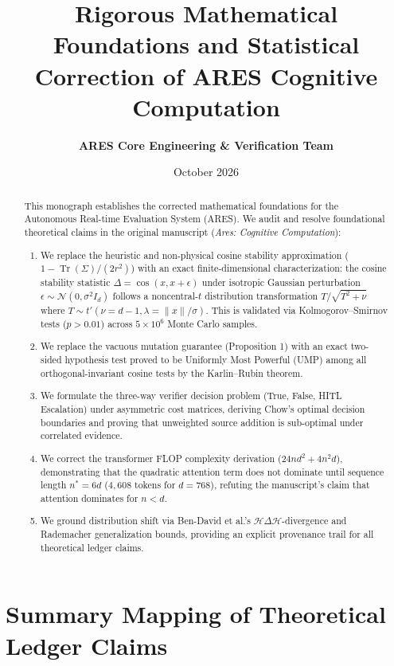 \documentclass[11pt,a4paper]{article}
\title{\textbf{Rigorous Mathematical Foundations and Statistical Correction of ARES Cognitive Computation}}
\author{\textbf{ARES Core Engineering \& Verification Team}}
\date{October 2026}
\theoremstyle{definition}
\begin{document}
\maketitle

\begin{abstract}
This monograph establishes the corrected mathematical foundations for the Autonomous Real-time Evaluation System (ARES). We audit and resolve foundational theoretical claims in the original manuscript (\textit{Ares: Cognitive Computation}):
\begin{enumerate}
    \item We replace the heuristic and non-physical cosine stability approximation ($1 - \operatorname{Tr}(\Sigma)/(2r^2)$) with an exact finite-dimensional characterization: the cosine stability statistic $\Delta = \cos(x, x+\epsilon)$ under isotropic Gaussian perturbation $\epsilon \sim \mathcal{N}(0, \sigma^2 I_d)$ follows a noncentral-$t$ distribution transformation $T / \sqrt{T^2 + \nu}$ where $T \sim t'(\nu = d-1, \lambda = \|x\|/\sigma)$. This is validated via Kolmogorov--Smirnov tests ($p > 0.01$) across $5 \times 10^6$ Monte Carlo samples.
    \item We replace the vacuous mutation guarantee (Proposition 1) with an exact two-sided hypothesis test proved to be Uniformly Most Powerful (UMP) among all orthogonal-invariant cosine tests by the Karlin--Rubin theorem.
    \item We formulate the three-way verifier decision problem (True, False, HITL Escalation) under asymmetric cost matrices, deriving Chow's optimal decision boundaries and proving that unweighted source addition is sub-optimal under correlated evidence.
    \item We correct the transformer FLOP complexity derivation ($24nd^2 + 4n^2d$), demonstrating that the quadratic attention term does not dominate until sequence length $n^* = 6d$ ($4{,}608$ tokens for $d=768$), refuting the manuscript's claim that attention dominates for $n < d$.
    \item We ground distribution shift via Ben-David et al.'s $\mathcal{H}\Delta\mathcal{H}$-divergence and Rademacher generalization bounds, providing an explicit provenance trail for all theoretical ledger claims.
\end{enumerate}
\end{abstract}

\tableofcontents
\newpage

\section{Summary Mapping of Theoretical Ledger Claims}
\label{sec:ledger_mapping}
\end{document}
